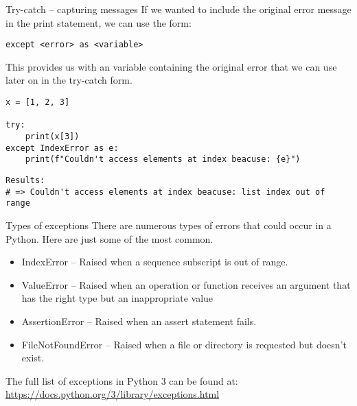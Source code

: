 \documentclass[10pt]{beamer}
\begin{document}
\begin{frame}[label={sec:orgb541120},fragile]{Try-catch -- capturing messages}
 If we wanted to include the original error message in the print statement, we can use
the form:

\begin{verbatim}
except <error> as <variable>
\end{verbatim}

This provides us with an variable containing the original error that we can use later
on in the try-catch form.

\begin{verbatim}
x = [1, 2, 3]

try:
    print(x[3])
except IndexError as e:
    print(f"Couldn't access elements at index beacuse: {e}")
\end{verbatim}

\begin{verbatim}
Results: 
# => Couldn't access elements at index beacuse: list index out of range
\end{verbatim}
\end{frame}

\begin{frame}[label={sec:org9bec6a4}]{Types of exceptions}
There are numerous types of errors that could occur in a Python. Here are just some
of the most common.

\begin{itemize}
\item IndexError -- Raised when a sequence subscript is out of range.
\item ValueError -- Raised when an operation or function receives an argument that has the right type but an inappropriate value
\item AssertionError -- Raised when an assert statement fails.
\item FileNotFoundError -- Raised when a file or directory is requested but doesn’t exist.
\end{itemize}

The full list of exceptions in Python 3 can be found at: \url{https://docs.python.org/3/library/exceptions.html}
\end{frame}
\end{document}
